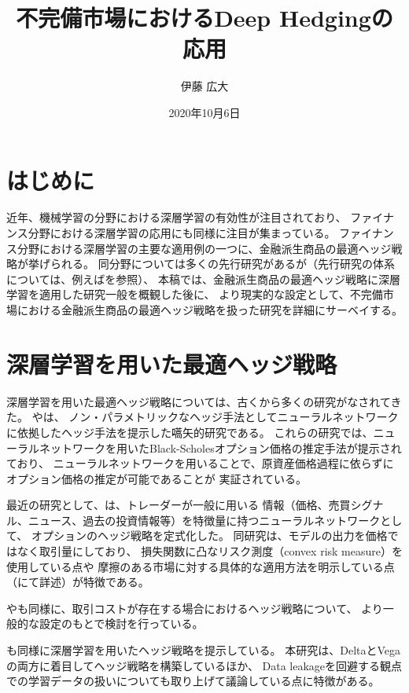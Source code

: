 \documentclass[autodetect-engine, dvipdfmx-if-dvi, ja=standard]{ltjsarticle}
\title{不完備市場におけるDeep Hedgingの応用}
\author{伊藤 広大}
\date{2020年10月6日}
\begin{document}
\maketitle

\section{はじめに}
近年、機械学習の分野における深層学習の有効性が注目されており、
ファイナンス分野における深層学習の応用にも同様に注目が集まっている。
ファイナンス分野における深層学習の主要な適用例の一つに、金融派生商品の最適ヘッジ戦略が挙げられる。
同分野については多くの先行研究があるが（先行研究の体系については、例えば\cite{ruf2020neural}を参照）、
本稿では、金融派生商品の最適ヘッジ戦略に深層学習を適用した研究一般を概観した後に、
より現実的な設定として、不完備市場における金融派生商品の最適ヘッジ戦略を扱った研究を詳細にサーベイする。


\section{深層学習を用いた最適ヘッジ戦略}
深層学習を用いた最適ヘッジ戦略については、古くから多くの研究がなされてきた。
\cite{malliaris1993neural}や\cite{hutchinson1994nonparametric}は、
ノン・パラメトリックなヘッジ手法としてニューラルネットワークに依拠したヘッジ手法を提示した嚆矢的研究である。
これらの研究では、ニューラルネットワークを用いたBlack-Scholesオプション価格の推定手法が提示されており、
ニューラルネットワークを用いることで、原資産価格過程に依らずにオプション価格の推定が可能であることが
実証されている。

最近の研究として、\cite{buehler2019deepA,buehler2019deepB}は、トレーダーが一般に用いる
情報（価格、売買シグナル、ニュース、過去の投資情報等）を特徴量に持つニューラルネットワークとして、
オプションのヘッジ戦略を定式化した。
同研究は、モデルの出力を価格ではなく取引量にしており、
損失関数に凸なリスク測度（convex risk measure）を使用している点や
摩擦のある市場に対する具体的な適用方法を明示している点（\cite{buehler2019deepB}にて詳述）が特徴である。

\cite{kolm2019dynamic}や\cite{du2020deep}も同様に、取引コストが存在する場合におけるヘッジ戦略について、
より一般的な設定のもとで検討を行っている。

\cite{ruf2020hedging}も同様に深層学習を用いたヘッジ戦略を提示している。
本研究は、DeltaとVegaの両方に着目してヘッジ戦略を構築しているほか、
Data leakageを回避する観点での学習データの扱いについても取り上げて議論している点に特徴がある。
\end{document}
